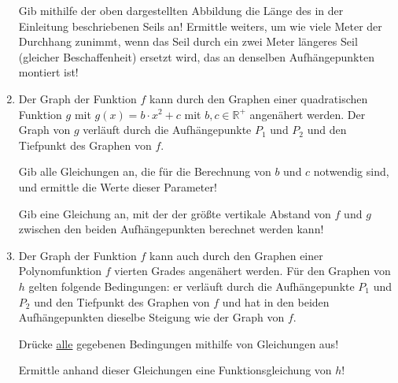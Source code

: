 \begin{langesbeispiel}
\begin{enumerate}
	Gib mithilfe der oben dargestellten Abbildung die Länge des in der Einleitung beschriebenen Seils an! Ermittle weiters, um wie viele Meter der Durchhang zunimmt, wenn das Seil durch ein zwei Meter längeres Seil (gleicher Beschaffenheit) ersetzt wird, das an denselben Aufhängepunkten montiert ist!\leer
	
	\item Der Graph der Funktion $f$ kann durch den Graphen einer quadratischen Funktion $g$ mit $g(x)=b\cdot x^2+c$ mit $b,c\in\mathbb{R}^+$ angenähert werden. Der Graph von $g$ verläuft durch die Aufhängepunkte $P_1$ und $P_2$ und den Tiefpunkt des Graphen von $f$.\leer
	
	Gib alle Gleichungen an, die für die Berechnung von $b$ und $c$ notwendig sind, und ermittle die Werte dieser Parameter!\leer
	
	Gib eine Gleichung an, mit der der größte vertikale Abstand von $f$ und $g$ zwischen den beiden Aufhängepunkten berechnet werden kann!\leer
	
	\item Der Graph der Funktion $f$ kann auch durch den Graphen einer Polynomfunktion $f$ vierten Grades angenähert werden. Für den Graphen von $h$ gelten folgende Bedingungen: er verläuft durch die Aufhängepunkte $P_1$ und $P_2$ und den Tiefpunkt des Graphen von $f$ und hat in den beiden Aufhängepunkten dieselbe Steigung wie der Graph von $f$.\leer
	
	Drücke \underline{alle} gegebenen Bedingungen mithilfe von Gleichungen aus!\leer
	
	Ermittle anhand dieser Gleichungen eine Funktionsgleichung von $h$!
	
\end{enumerate}

\end{langesbeispiel}
